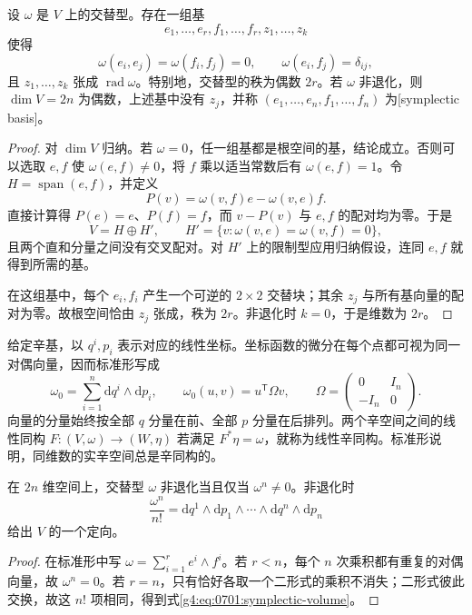 \begin{theorem}\label{g4:thm:0701:symplectic-basis}
	设 \(\omega\) 是 \(V\) 上的交替型。存在一组基
	\[
		e_1,\ldots,e_r,f_1,\ldots,f_r,z_1,\ldots,z_k
	\]
	使得
	\[
		\omega(e_i,e_j)=\omega(f_i,f_j)=0,\qquad
		\omega(e_i,f_j)=\delta_{ij},
	\]
	且 \(z_1,\ldots,z_k\) 张成 \(\operatorname{rad}\omega\)。特别地，交替型的秩为偶数 \(2r\)。若 \(\omega\) 非退化，则 \(\dim V=2n\) 为偶数，上述基中没有 \(z_j\)，并称 \((e_1,\ldots,e_n,f_1,\ldots,f_n)\) 为[symplectic basis]。
\end{theorem}
\begin{proof}
	对 \(\dim V\) 归纳。若 \(\omega=0\)，任一组基都是根空间的基，结论成立。否则可以选取 \(e,f\) 使 \(\omega(e,f)\ne0\)，将 \(f\) 乘以适当常数后有 \(\omega(e,f)=1\)。令 \(H=\operatorname{span}(e,f)\)，并定义
	\[
		P(v)=\omega(v,f)e-\omega(v,e)f.
	\]
	直接计算得 \(P(e)=e\)、\(P(f)=f\)，而 \(v-P(v)\) 与 \(e,f\) 的配对均为零。于是
	\[
		V=H\oplus H',\qquad
		H'=\{v:\omega(v,e)=\omega(v,f)=0\},
	\]
	且两个直和分量之间没有交叉配对。对 \(H'\) 上的限制型应用归纳假设，连同 \(e,f\) 就得到所需的基。

	在这组基中，每个 \(e_i,f_i\) 产生一个可逆的 \(2\times2\) 交替块；其余 \(z_j\) 与所有基向量的配对为零。故根空间恰由 \(z_j\) 张成，秩为 \(2r\)。非退化时 \(k=0\)，于是维数为 \(2r\)。
\end{proof}

给定辛基，以 \(q^i,p_i\) 表示对应的线性坐标。坐标函数的微分在每个点都可视为同一对偶向量，因而标准形写成
\begin{equation}\label{g4:eq:0701:standard-form}
	\omega_0=\sum_{i=1}^n\mathrm{d}q^i\wedge\mathrm{d}p_i,
	\qquad
	\omega_0(u,v)=u^{\mathsf T}\Omega v,
	\qquad
	\Omega=\begin{pmatrix}0&I_n\\-I_n&0\end{pmatrix}.
\end{equation}
向量的分量始终按全部 \(q\) 分量在前、全部 \(p\) 分量在后排列。两个辛空间之间的线性同构 \(F:(V,\omega)\to(W,\eta)\) 若满足 \(F^*\eta=\omega\)，就称为线性辛同构。标准形说明，同维数的实辛空间总是辛同构的。

\begin{corollary}\label{g4:cor:0701:top-power}
	在 \(2n\) 维空间上，交替型 \(\omega\) 非退化当且仅当 \(\omega^n\ne0\)。非退化时
	\begin{equation}\label{g4:eq:0701:symplectic-volume}
		\frac{\omega^n}{n!}
		=\mathrm{d}q^1\wedge\mathrm{d}p_1\wedge\cdots\wedge
		\mathrm{d}q^n\wedge\mathrm{d}p_n
	\end{equation}
	给出 \(V\) 的一个定向。
\end{corollary}
\begin{proof}
	在标准形中写 \(\omega=\sum_{i=1}^r e^i\wedge f^i\)。若 \(r<n\)，每个 \(n\) 次乘积都有重复的对偶向量，故 \(\omega^n=0\)。若 \(r=n\)，只有恰好各取一个二形式的乘积不消失；二形式彼此交换，故这 \(n!\) 项相同，得到式\eqref{g4:eq:0701:symplectic-volume}。
\end{proof}

